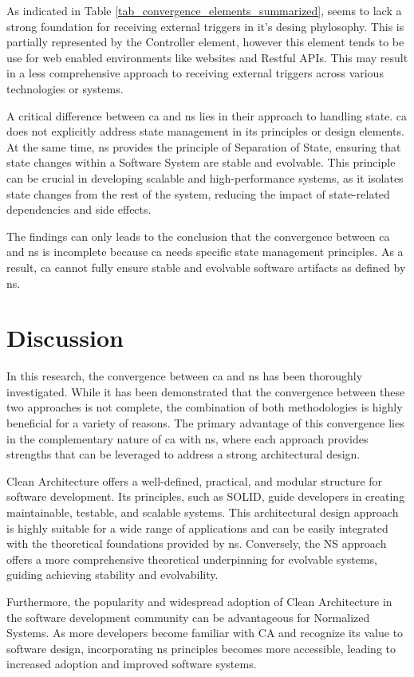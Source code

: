 As indicated in Table \ref{tab_convergence_elements_summarized}, seems to lack a strong
foundation for receiving external triggers in it's desing phylosophy. This is partially
represented by the Controller element, however this element tends to be use for web
enabled environments like websites and Restful APIs. This may result in a less
comprehensive approach to receiving external triggers across various technologies or
systems.

A critical difference between \gls{ca} and \gls{ns} lies in their approach to handling
state. \gls{ca} does not explicitly address state management in its principles or design
elements. At the same time, \gls{ns} provides the principle of Separation of State,
ensuring that state changes within a Software System are stable and evolvable. This
principle can be crucial in developing scalable and high-performance systems, as it
isolates state changes from the rest of the system, reducing the impact of state-related
dependencies and side effects. 

The findings can only leads to the conclusion that the convergence between \gls{ca} and
\gls{ns} is incomplete because \gls{ca} needs specific state management principles. As a
result, \gls{ca} cannot fully ensure stable and evolvable software artifacts as defined by
\gls{ns}.


\section{Discussion}

In this research, the convergence between \gls{ca} and \gls{ns} has been thoroughly
investigated. While it has been demonstrated that the convergence between these two
approaches is not complete, the combination of both methodologies is highly beneficial for
a variety of reasons. The primary advantage of this convergence lies in the complementary
nature of \gls{ca} with \gls{ns}, where each approach provides strengths that can be
leveraged to address a strong architectural design. 

Clean Architecture offers a well-defined, practical, and modular structure for software
development. Its principles, such as SOLID, guide developers in creating maintainable,
testable, and scalable systems. This architectural design approach is highly suitable for
a wide range of applications and can be easily integrated with the theoretical foundations
provided by \gls{ns}. Conversely, the NS approach offers a more comprehensive theoretical
underpinning for evolvable systems, guiding achieving stability and evolvability.

Furthermore, the popularity and widespread adoption of Clean Architecture in the software
development community can be advantageous for Normalized Systems. As more developers
become familiar with CA and recognize its value to software design, incorporating \gls{ns}
principles becomes more accessible, leading to increased adoption and improved software
systems.



